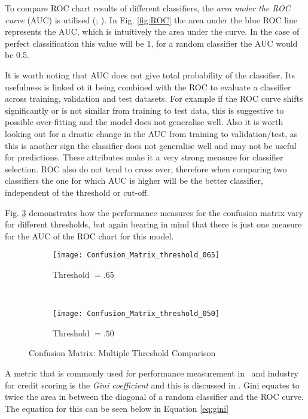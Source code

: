 To compare ROC chart results of different classifiers, the \textit{area under the ROC curve} (AUC) is utilised (\cite{bradley_use_1997}; \cite{hanley_meaning_1982}). In Fig. \ref{fig:ROC} the area under the blue ROC line represents the AUC, which is intuitively the area under the curve. In the case of perfect classification this value will be 1, for a random classifier the AUC would be 0.5. 

It is worth noting that AUC does not give total probability of the classifier. Its usefulness is linked ot it being combined with the ROC to evaluate a classifier across training, validation and test datasets. For example if the ROC curve shifts significantly or is not similar from training to test data, this is suggestive to possible over-fitting and the model does not generalise well. Also it is worth looking out for a drastic change in the AUC from training to validation/test, as this is another sign the classifier does not generalise well and may not be useful for predictions. These attributes make it a very strong measure for classifier selection. ROC also do not tend to cross over, therefore when comparing two classifiers the one for which AUC is higher will be the better classifier, independent of the threshold or cut-off.

Fig. \ref{fig:matric_compare} demonstrates how the performance measures for the confusion matrix vary for different thresholds, but again bearing in mind that there is just one measure for the AUC of the ROC chart for this model.

\begin{figure}[H]
	\centering
	\begin{subfigure}[b]{0.45\textwidth}
		\captionsetup{font=scriptsize}
		\texttt{[image: Confusion\_Matrix\_threshold\_065]}
		\caption{Threshold $=.65$}\label{fig:Threshold65}
	\end{subfigure} ~\quad
	\begin{subfigure}[b]{0.45\textwidth}
		\captionsetup{font=scriptsize}
		\texttt{[image: Confusion\_Matrix\_threshold\_050]}
		\caption{Threshold $=.50$}\label{fig:Threshold50}
	\end{subfigure}
	\caption{Confusion Matrix: Multiple Threshold Comparison}
	\label{fig:matric_compare}
\end{figure}

A metric that is commonly used for performance measurement in \subjectname\ and industry for credit scoring is the \textit{Gini coefficient} and this is discussed in \citep{hand_good_2005}. Gini equates to twice the area in between the diagonal of a random classifier and the ROC curve. The equation for this can be seen below in Equation \ref{eq:gini}

